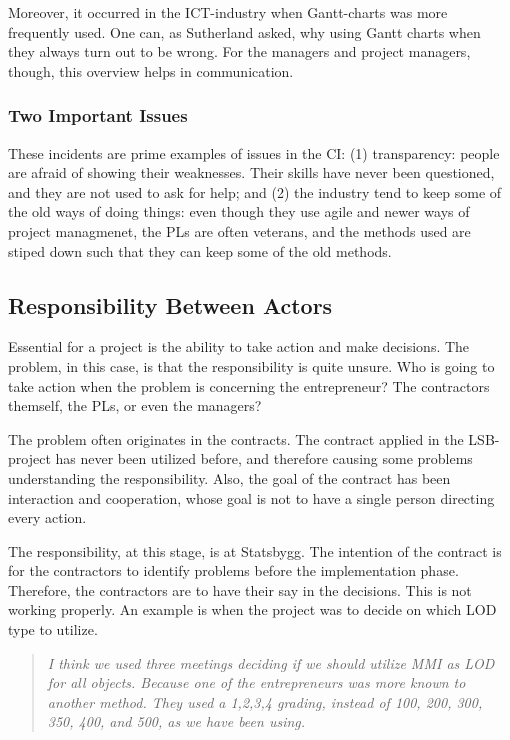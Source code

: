 Moreover, it occurred in the ICT-industry when Gantt-charts was more frequently used. One can, as Sutherland asked, why using Gantt charts when they always turn out to be wrong. For the managers and project managers, though, this overview helps in communication.

\subsubsection{Two Important Issues}
These incidents are prime examples of issues in the CI: (1) transparency: people are afraid of showing their weaknesses. Their skills have never been questioned, and they are not used to ask for help; and (2) the industry tend to keep some of the old ways of doing things: even though they use agile and newer ways of project managmenet, the PLs are often veterans, and the methods used are stiped down such that they can keep some of the old methods.

\subsection{Responsibility Between Actors}
Essential for a project is the ability to take action and make decisions. The problem, in this case, is that the responsibility is quite unsure. Who is going to take action when the problem is concerning the entrepreneur? The contractors themself, the PLs, or even the managers? 

The problem often originates in the contracts. The contract applied in the LSB-project has never been utilized before, and therefore causing some problems understanding the responsibility. Also, the goal of the contract has been interaction and cooperation, whose goal is not to have a single person directing every action. 

The responsibility, at this stage, is at Statsbygg. The intention of the contract is for the contractors to identify problems before the implementation phase. Therefore, the contractors are to have their say in the decisions. This is not working properly. An example is when the project was to decide on which LOD type to utilize.
\begin{quote}
    \textit{I think we used three meetings deciding if we should utilize MMI as LOD for all objects. Because one of the entrepreneurs was more known to another method. They used a 1,2,3,4 grading, instead of 100, 200, 300, 350, 400, and 500, as we have been using.}
\end{quote}

